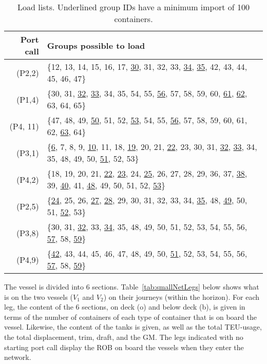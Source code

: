 \begin{table}[width=.9\linewidth,cols=2,pos=h]
\begin{scriptsize}
\begin{tabular*}{\tblwidth}{@{} RL @{}}
\toprule
Port call 			   & Groups possible to load\\
\midrule
	(P2,\phantom{ 1}2) & \{12, 13, 14, 15, 16, 17, \ul{30}, 31, 32, 33, \ul{34}, \ul{35}, 42, 43, 44, 45, 46, 47\}\\
	(P1,\phantom{ 1}4) & \{30, 31, \ul{32}, \ul{33}, 34, 35, 54, 55, \ul{56}, 57, 58, 59, 60, \ul{61}, \ul{62}, 63, 64, 65\}\\
	(P4,		   11) & \{47, 48, 49, \ul{50}, 51, 52, \ul{53}, 54, 55, \ul{56}, 57, 58, 59, 60, 61, 62, \ul{63}, 64\}\\
	(P3,\phantom{ 1}1) & \{\ul{6}, 7, 8, 9, \ul{10}, 11, 18, \ul{19}, 20, 21, \ul{22}, 23, 30, 31, \ul{32}, \ul{33}, 34, 35, 48, 49, 50, \ul{51}, 52, 53\}\\
	(P4,\phantom{ 1}2) & \{18, 19, 20, 21, \ul{22}, \ul{23}, 24, \ul{25}, 26, 27, 28, 29, 36, 37, \ul{38}, 39, \ul{40}, 41, \ul{48}, 49, 50, 51, 52, \ul{53}\}\\
	(P2,\phantom{ 1}5) & \{\ul{24}, 25, 26, \ul{27}, \ul{28}, 29, 30, 31, 32, 33, 34, \ul{35}, 48, \ul{49}, 50, 51, \ul{52}, 53\}\\
	(P3,\phantom{ 1}8) & \{30, 31, \ul{32}, 33, \ul{34}, 35, 48, 49, 50, 51, 52, 53, 54, 55, 56, \ul{57}, 58, \ul{59}\}\\
	(P4,\phantom{ 1}9) & \{\ul{42}, 43, 44, 45, 46, 47, 48, 49, 50, \ul{51}, 52, 53, 54, 55, 56, \ul{57}, 58, \ul{59}\}\\
\bottomrule
\end{tabular*}
\caption{Load lists. Underlined group IDs have a minimum import of 100 containers.}\label{tab:loadLists}
\end{scriptsize}
\end{table}

The vessel is divided into 6 sections. 
Table~\ref{tab:smallNetLegs} below shows what is on the two vessels ($V_1$ and $V_2$) on their journeys (within the horizon). For each leg, the content of the 6 sections, on deck (o) and below deck (b), is given in terms of the number of containers of each type of container that is on board the vessel. Likewise, the content of the tanks is given, as well as the total TEU-usage, the total displacement, trim, draft, and the GM. The legs indicated with no starting port call display the ROB on board the vessels when they enter the network.

